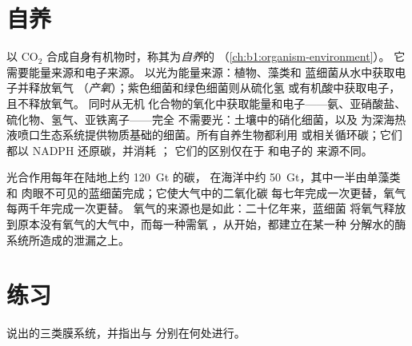 \section{自养}

\begin{definition}[自养]\label{def:b1:photosynthesis:autotrophy}
以 $\mathrm{CO_2}$ 合成自身有机物时，称其为\emph{自养}的
（\cref{ch:b1:organism-environment}）。
它需要能量来源和电子来源。
\emph{}以光为能量来源：植物、藻类和
蓝细菌从水中获取电子并释放氧气
（\emph{产氧}）；紫色细菌和绿色细菌则从硫化氢
或有机酸中获取电子，且不释放氧气。\emph{}
同时从无机
化合物的氧化中获取能量和电子——氨、亚硝酸盐、硫化物、氢气、亚铁离子——完全
不需要光：土壤中的硝化细菌，以及
为深海热液喷口生态系统提供物质基础的细菌。所有自养生物都利用
或相关循环碳；它们都以 NADPH 还原碳，并消耗 ；
它们的区别仅在于  和电子的
来源不同。
\end{definition}

\begin{example}[全球收支]\label{ex:b1:photosynthesis:global}
光合作用每年在陆地上约 \qty{120}{Gt} 的碳，
在海洋中约 \qty{50}{Gt}，其中一半由单藻类和
肉眼不可见的蓝细菌完成；它使大气中的二氧化碳
每七年完成一次更替，氧气每两千年完成一次更替。
氧气的来源也是如此：二十亿年来，蓝细菌
将氧气释放到原本没有氧气的大气中，而每一种需氧
，从开始，都建立在某一种
分解水的酶系统所造成的泄漏之上。
\end{example}

\section{练习}

\begin{exercise}[$\star$]\label{exo:b1:photosynthesis:1}
说出的三类膜系统，并指出与
分别在何处进行。
\end{exercise}

